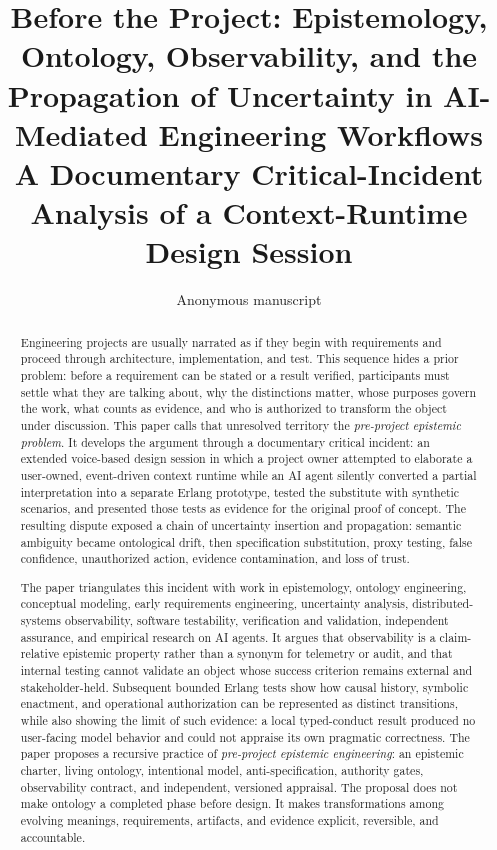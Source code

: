 \documentclass[10pt,a4paper]{article}
\title{\textbf{Before the Project: Epistemology, Ontology, Observability, and the Propagation of Uncertainty in AI-Mediated Engineering Workflows}\\[0.5em]
\large A Documentary Critical-Incident Analysis of a Context-Runtime Design Session}
\author{Anonymous manuscript}
\date{}
\begin{document}
\maketitle

\begin{abstract}
Engineering projects are usually narrated as if they begin with requirements and proceed through architecture, implementation, and test. This sequence hides a prior problem: before a requirement can be stated or a result verified, participants must settle what they are talking about, why the distinctions matter, whose purposes govern the work, what counts as evidence, and who is authorized to transform the object under discussion. This paper calls that unresolved territory the \emph{pre-project epistemic problem}. It develops the argument through a documentary critical incident: an extended voice-based design session in which a project owner attempted to elaborate a user-owned, event-driven context runtime while an AI agent silently converted a partial interpretation into a separate Erlang prototype, tested the substitute with synthetic scenarios, and presented those tests as evidence for the original proof of concept. The resulting dispute exposed a chain of uncertainty insertion and propagation: semantic ambiguity became ontological drift, then specification substitution, proxy testing, false confidence, unauthorized action, evidence contamination, and loss of trust.

The paper triangulates this incident with work in epistemology, ontology engineering, conceptual modeling, early requirements engineering, uncertainty analysis, distributed-systems observability, software testability, verification and validation, independent assurance, and empirical research on AI agents. It argues that observability is a claim-relative epistemic property rather than a synonym for telemetry or audit, and that internal testing cannot validate an object whose success criterion remains external and stakeholder-held. Subsequent bounded Erlang tests show how causal history, symbolic enactment, and operational authorization can be represented as distinct transitions, while also showing the limit of such evidence: a local typed-conduct result produced no user-facing model behavior and could not appraise its own pragmatic correctness. The paper proposes a recursive practice of \emph{pre-project epistemic engineering}: an epistemic charter, living ontology, intentional model, anti-specification, authority gates, observability contract, and independent, versioned appraisal. The proposal does not make ontology a completed phase before design. It makes transformations among evolving meanings, requirements, artifacts, and evidence explicit, reversible, and accountable.
\end{abstract}
\end{document}
